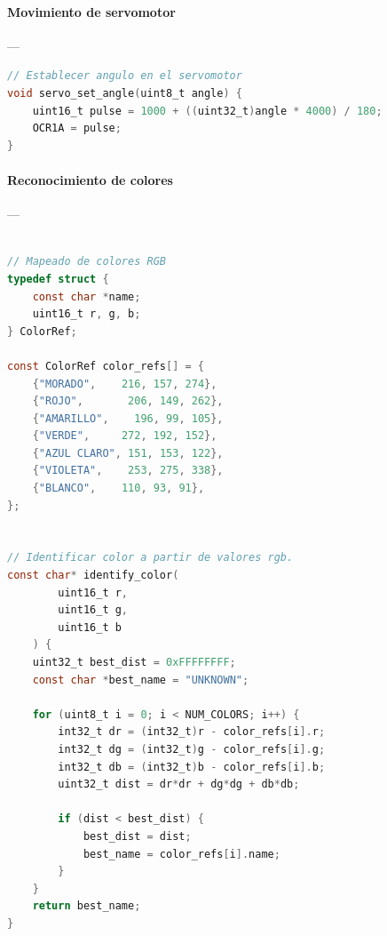 \paragraph{Movimiento de servomotor}\label{anexo:servomotor}---\\
\begin{lstlisting}[language=C, caption={Movimiento de servomotor}]
// Establecer angulo en el servomotor
void servo_set_angle(uint8_t angle) {
	uint16_t pulse = 1000 + ((uint32_t)angle * 4000) / 180;
	OCR1A = pulse;
}
\end{lstlisting}



\paragraph{Reconocimiento de colores}\label{anexo:reconocimiento_colores}---\\
\begin{lstlisting}[language=C, caption={Reconocimiento de colores}]

// Mapeado de colores RGB
typedef struct {
	const char *name;
	uint16_t r, g, b;
} ColorRef;

const ColorRef color_refs[] = {
	{"MORADO",    216, 157, 274},
	{"ROJO",       206, 149, 262},
	{"AMARILLO",    196, 99, 105},
	{"VERDE",     272, 192, 152},
	{"AZUL CLARO", 151, 153, 122},
	{"VIOLETA",    253, 275, 338},
	{"BLANCO",    110, 93, 91},
};


// Identificar color a partir de valores rgb.
const char* identify_color(
		uint16_t r, 
		uint16_t g, 
		uint16_t b
	) {
	uint32_t best_dist = 0xFFFFFFFF;
	const char *best_name = "UNKNOWN";

	for (uint8_t i = 0; i < NUM_COLORS; i++) {
		int32_t dr = (int32_t)r - color_refs[i].r;
		int32_t dg = (int32_t)g - color_refs[i].g;
		int32_t db = (int32_t)b - color_refs[i].b;
		uint32_t dist = dr*dr + dg*dg + db*db;

		if (dist < best_dist) {
			best_dist = dist;
			best_name = color_refs[i].name;
		}
	}
	return best_name;
}
\end{lstlisting}

